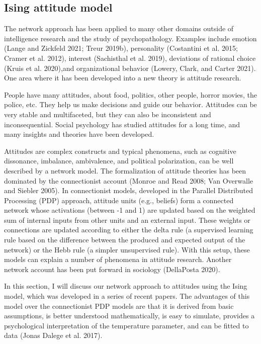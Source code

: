 \documentclass[
  a4paper,
  DIV=11,
  numbers=noendperiod]{scrreprt}
\begin{document}
\hypertarget{sec-Ising-attitude-model}{%
\subsection{Ising attitude model}\label{sec-Ising-attitude-model}}

The network approach has been applied to many other domains outside of
intelligence research and the study of psychopathology. Examples include
emotion (Lange and Zickfeld 2021; Treur 2019b), personality (Costantini
et al. 2015; Cramer et al. 2012), interest (Sachisthal et al. 2019),
deviations of rational choice (Kruis et al. 2020),and organizational
behavior (Lowery, Clark, and Carter 2021). One area where it has been
developed into a new theory is attitude research.

People have many attitudes, about food, politics, other people, horror
movies, the police, etc. They help us make decisions and guide our
behavior. Attitudes can be very stable and multifaceted, but they can
also be inconsistent and inconsequential. Social psychology has studied
attitudes for a long time, and many insights and theories have been
developed.

Attitudes are complex constructs and typical phenomena, such as
cognitive dissonance, imbalance, ambivalence, and political
polarization, can be well described by a network model. The
formalization of attitude theories has been dominated by the
connectionist account (Monroe and Read 2008; Van Overwalle and Siebler
2005). In connectionist models, developed in the Parallel Distributed
Processing (PDP) approach, attitude units (e.g., beliefs) form a
connected network whose activations (between -1 and 1) are updated based
on the weighted sum of internal inputs from other units and an external
input. These weights or connections are updated according to either the
delta rule (a supervised learning rule based on the difference between
the produced and expected output of the network) or the Hebb rule (a
simpler unsupervised rule). With this setup, these models can explain a
number of phenomena in attitude research. Another network account has
been put forward in sociology (DellaPosta 2020).

In this section, I will discuss our network approach to attitudes using
the Ising model, which was developed in a series of recent papers. The
advantages of this model over the connectionist PDP models are that it
is derived from basic assumptions, is better understood mathematically,
is easy to simulate, provides a psychological interpretation of the
temperature parameter, and can be fitted to data (Jonas Dalege et al.
2017).
\end{document}
